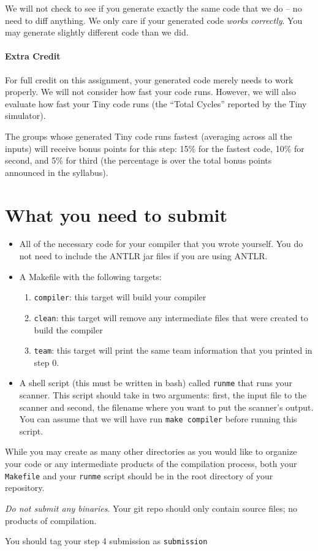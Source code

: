 \documentclass{article}
\begin{document}
We will not check to see if you generate exactly the same code that we do -- no need to diff anything. We only care if your generated code {\em works correctly}. You may generate slightly different code than we did.

\paragraph{Extra Credit}
For full credit on this assignment, your generated code merely needs to work properly. We will not consider how fast your code runs. However, we will also evaluate how fast your Tiny code runs (the ``Total Cycles'' reported by the Tiny simulator).

The groups whose generated Tiny code runs fastest (averaging across all the inputs) will receive bonus points for this step: 15\% for the fastest code, 10\% for second, and 5\% for third (the percentage is over the total bonus points announced in the syllabus).

\section{What you need to submit}
\begin{itemize}
	\item All of the necessary code for your compiler that you wrote yourself. You do not need to include the ANTLR jar files if you are using ANTLR.
	\item A Makefile with the following targets:
		\begin{enumerate}
			\item \texttt{compiler}: this target will build your compiler
			\item \texttt{clean}: this target will remove any intermediate files that were created to build the compiler
			\item \texttt{team}: this target will print the same team information that you printed in step 0.
		\end{enumerate}

	\item A shell script (this must be written in bash) called \texttt{runme} that runs your scanner. This script should take in two arguments: first, the input file to the scanner and second, the filename where you want to put the scanner's output. You can assume that we will have run \texttt{make compiler} before running this script.
\end{itemize}
	
	While you may create as many other directories as you would like to organize your code or any intermediate products of the compilation process, both your \texttt{Makefile} and your \texttt{runme} script should be in the root directory of your repository.

{\em Do not submit any binaries}. Your git repo should only contain source files; no products of compilation.

You should tag your step 4 submission as \texttt{submission}
\end{document}
